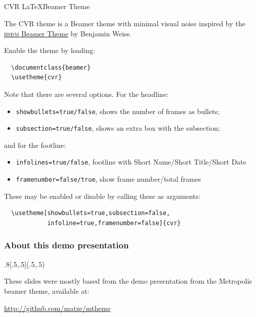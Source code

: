 \documentclass[10pt, fleqn, dvipsnames]{beamer}
\newlength{\slidew}
\newlength{\slideh}
\begin{document}
\subsection{}  %


\begin{frame}[fragile]{CVR \LaTeX Beamer Theme}

The CVR theme is a Beamer theme with minimal visual noise
inspired by the \href{https://github.com/hsrmbeamertheme/hsrmbeamertheme}{\textsc{hsrm} Beamer
Theme} by Benjamin Weiss.

\medskip

Enable the theme by loading:
{\footnotesize
\begin{verbatim}
  \documentclass{beamer}
  \usetheme{cvr}
\end{verbatim}
}

\medskip

Note that there are several options. For the headline:
\begin{itemize}
\footnotesize
\item \texttt{showbullets=true/false}, shows the number of frames as bullets;
\item \texttt{subsection=true/false}, shows an extra box with the subsection;
\end{itemize}
\noindent
and for the footline:
\begin{itemize}
\footnotesize
\item \texttt{infolines=true/false}, footline with Short Name/Short Title/Short Date
\item \texttt{framenumber=false/true}, show frame number/total frames
\end{itemize}

\medskip

These may be enabled or disable by calling these as arguments:
{\footnotesize
\begin{verbatim}
  \usetheme[showbullets=true,subsection=false,
            infoline=true,framenumber=false]{cvr}
\end{verbatim}
}

\end{frame}


\begin{frame}
\frametitle{About this demo presentation}

\begin{textblock*}{.8\slidew}[.5,.5](.5\slidew,.5\slideh)
\begin{center}

These slides were mostly based from the demo
presentation from the Metropolis beamer theme,
available at:

\url{http://github.com/matze/mtheme}
\end{center}
\end{textblock*}

\end{frame}
\end{document}
